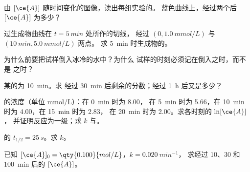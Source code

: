 \begin{exercise}[$\star$]\label{exo:g12:reaction-rates:2}
由 $[\ce{A}]$ 随时间变化的图像，读出每组实验的。
蓝色曲线上，经过两个后 $[\ce{A}]$ 为多少？
\end{exercise}

\begin{exercise}[$\star$]\label{exo:g12:reaction-rates:3}
过生成物曲线在 $t = \qty{5}{min}$ 处所作的切线，
经过 $(0, \qty{1.0}{mmol/L})$ 与 $(\qty{10}{min}, \qty{5.0}{mmol/L})$ 两点。
求 \qty{5}{min} 时生成物的。
\end{exercise}

\begin{exercise}[$\star$]\label{exo:g12:reaction-rates:4}
为什么前要把试样倒入冰冷的水中？为什么
试样的时刻必须记在倒入之时，而不是
之时？
\end{exercise}

\begin{exercise}[$\star$]\label{exo:g12:reaction-rates:5}
某的为 \qty{10}{min}。求
经过 \qty{30}{min} 后剩余的分数；经过 \qty{1}{h} 后又是多少？
\end{exercise}

\begin{exercise}[$\star\star$]\label{exo:g12:reaction-rates:6}
的浓度（单位 \si{mmol/L}）：在 \qty{0}{min} 时为 8.00，
在 \qty{5}{min} 时为 5.66，在 \qty{10}{min} 时为 4.00，在 \qty{15}{min} 时为 2.83，
在 \qty{20}{min} 时为 2.00。求各时刻的 $\ln[\ce{A}]$，
并证明反应为一级；求 $k$ 与。
\end{exercise}

\begin{exercise}[$\star\star$]\label{exo:g12:reaction-rates:7}
的 $t_{1/2} = \qty{25}{s}$。求 $k$。
\end{exercise}

\begin{exercise}[$\star\star$]\label{exo:g12:reaction-rates:8}
已知 $[\ce{A}]_0 = \qty{0.100}{mol/L}$，$k = \qty{0.020}{min^{-1}}$，
求经过 10、30 和 \qty{100}{min} 后的 $[\ce{A}]$。
\end{exercise}

